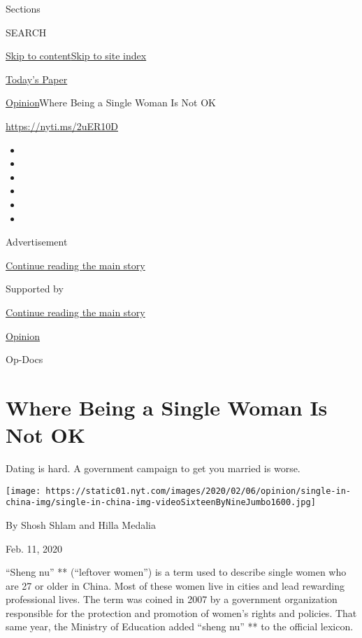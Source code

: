 Sections

SEARCH

\protect\hyperlink{site-content}{Skip to
content}\protect\hyperlink{site-index}{Skip to site index}

\href{https://myaccount.nytimes.com/auth/login?response_type=cookie\&client_id=vi}{}

\href{https://www.nytimes.com/section/todayspaper}{Today's Paper}

\href{/section/opinion}{Opinion}\textbar{}Where Being a Single Woman Is
Not OK

\href{https://nyti.ms/2uER10D}{https://nyti.ms/2uER10D}

\begin{itemize}
\item
\item
\item
\item
\item
\item
\end{itemize}

Advertisement

\protect\hyperlink{after-top}{Continue reading the main story}

Supported by

\protect\hyperlink{after-sponsor}{Continue reading the main story}

\href{/section/opinion}{Opinion}

Op-Docs

\hypertarget{where-being-a-single-woman-is-not-ok}{%
\section{Where Being a Single Woman Is Not
OK}\label{where-being-a-single-woman-is-not-ok}}

Dating is hard. A government campaign to get you married is worse.

\texttt{[image: https://static01.nyt.com/images/2020/02/06/opinion/single-in-china-img/single-in-china-img-videoSixteenByNineJumbo1600.jpg]}

By Shosh Shlam and Hilla Medalia

Feb. 11, 2020

``Sheng nu'' ** (``leftover women'') is a term used to describe single
women who are 27 or older in China. Most of these women live in cities
and lead rewarding professional lives. The term was coined in 2007 by a
government organization responsible for the protection and promotion of
women's rights and policies. That same year, the Ministry of Education
added ``sheng nu'' ** to the official lexicon.


